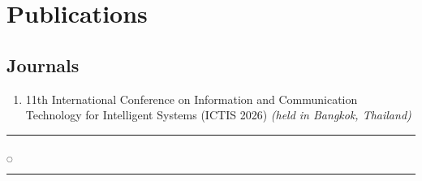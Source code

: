 \chapter*{Publications}
\section*{Journals}

\begin{enumerate}
	
	\item 
11th International Conference on Information and Communication Technology for Intelligent Systems (ICTIS 2026) \textit{(held in Bangkok, Thailand)}
	

\end{enumerate}







\noindent
\rule{0.49\textwidth}{0.75pt} $_{\bigcirc}$ \rule{0.49\textwidth}{0.75pt}\\







